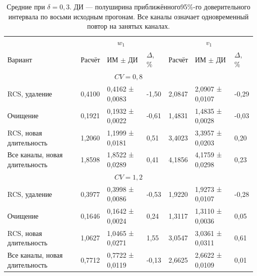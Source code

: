 \begin{table}[!htbp]
\centering\small\setlength{\tabcolsep}{2pt}
\begin{tabular}{@{}p{4.16cm}p{1.61cm}p{2.83cm}p{1.28cm}p{1.61cm}p{2.83cm}p{1.28cm}@{}}
\toprule
 & \multicolumn{3}{c}{$w_1$} & \multicolumn{3}{c}{$v_1$} \\
Вариант & Расчёт & ИМ $\pm$ ДИ & $\Delta$, \% & Расчёт & ИМ $\pm$ ДИ & $\Delta$, \% \\
\midrule
\multicolumn{7}{c}{$CV=0,8$} \\
RCS, удаление & 0,4100 & 0,4162 ± 0,0083 & -1,50 & 2,0847 & 2,0907 ± 0,0107 & -0,29 \\
Очищение & 0,1921 & 0,1932 ± 0,0022 & -0,61 & 1,4831 & 1,4835 ± 0,0028 & -0,03 \\
RCS, новая длительность & 1,2060 & 1,1999 ± 0,0181 & 0,51 & 3,4023 & 3,3957 ± 0,0203 & 0,20 \\
Все каналы, новая длительность & 1,8598 & 1,8522 ± 0,0289 & 0,41 & 4,1856 & 4,1759 ± 0,0298 & 0,23 \\
\multicolumn{7}{c}{$CV=1,2$} \\
RCS, удаление & 0,3977 & 0,3998 ± 0,0086 & -0,53 & 1,9220 & 1,9273 ± 0,0107 & -0,28 \\
Очищение & 0,1646 & 0,1642 ± 0,0024 & 0,24 & 1,3117 & 1,3110 ± 0,0036 & 0,05 \\
RCS, новая длительность & 1,0627 & 1,0465 ± 0,0271 & 1,55 & 3,0547 & 3,0361 ± 0,0311 & 0,61 \\
Все каналы, новая длительность & 0,7712 & 0,7722 ± 0,0119 & -0,13 & 2,6625 & 2,6622 ± 0,0109 & 0,01 \\
\bottomrule
\end{tabular}
\caption{Средние при $\delta=0{,}3$. ДИ --- полуширина приближённого95\%-го доверительного интервала по восьми исходным прогонам. Все каналы означает одновременный повтор на занятых каналах.}
\label{tab:results}
\end{table}

